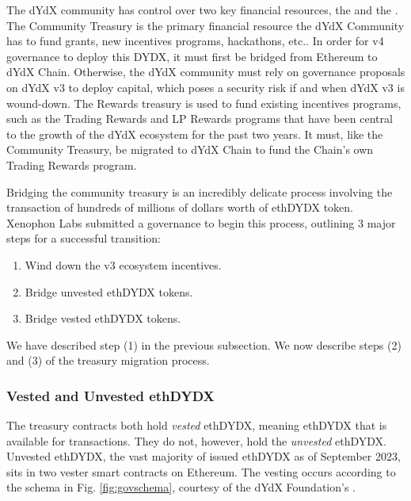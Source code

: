         The dYdX community has control over two key financial resources, the  and the . The Community Treasury is the primary financial resource the dYdX Community has to fund grants, new incentives programs, hackathons, etc.. In order for v4 governance to deploy this DYDX, it must first be bridged from Ethereum to dYdX Chain.  Otherwise, the dYdX community must rely on governance proposals on dYdX v3 to deploy capital, which poses a security risk if and when dYdX v3 is wound-down. The Rewards treasury is used to fund existing incentives programs, such as the Trading Rewards and LP Rewards programs that have been central to the growth of the dYdX ecosystem for the past two years. It must, like the Community Treasury, be migrated to dYdX Chain to fund the Chain's own Trading Rewards program.

        Bridging the community treasury is an incredibly delicate process involving the transaction of hundreds of millions of dollars worth of ethDYDX token. Xenophon Labs submitted a governance  to begin this process, outlining 3 major steps for a successful transition:

        \begin{enumerate}
            \item Wind down the v3 ecosystem incentives.
            \item Bridge unvested ethDYDX tokens.
            \item Bridge vested ethDYDX tokens.
        \end{enumerate}

        We have described step (1) in the previous subsection. We now describe steps (2) and (3) of the treasury migration process.

        \subsubsection{Vested and Unvested ethDYDX}

            The treasury contracts both hold \textit{vested} ethDYDX, meaning ethDYDX that is available for transactions. They do not, however, hold the \textit{unvested} ethDYDX. Unvested ethDYDX, the vast majority of issued ethDYDX as of September 2023, sits in two vester smart contracts on Ethereum. The vesting occurs according to the schema in Fig. \ref{fig:govschema}, courtesy of the dYdX Foundation's . 

